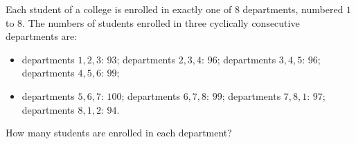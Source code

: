 Each student of a college is enrolled in exactly one of $8$ departments, numbered $1$ to $8$. The numbers of students enrolled in three cyclically consecutive departments are:
\begin{itemize}
\item departments $1,2,3$: $93$; departments $2,3,4$: $96$; departments $3,4,5$: $96$; departments $4,5,6$: $99$;
\item departments $5,6,7$: $100$; departments $6,7,8$: $99$; departments $7,8,1$: $97$; departments $8,1,2$: $94$.
\end{itemize}
How many students are enrolled in each department?
